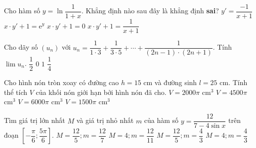 \begin{ex}%
Cho hàm số $y=\ln \dfrac{1}{1+x}$. Khẳng định nào sau đây là khẳng định \textbf{sai}?
\choice
	{$y'=\dfrac{-1}{x+1}$}
	{\True $x \cdot y'+1=\mathrm{e}^y$}
	{$x \cdot y'+1=0$}
	{$x \cdot y'+1=\dfrac{1}{x+1}$}
\end{ex}
\begin{ex}%
Cho dãy số $\left(u_n\right)$ với $u_n=\dfrac{1}{1 \cdot 3}+\dfrac{1}{3 \cdot 5}+\cdots +\dfrac{1}{(2n-1)\cdot(2n+1)}$. Tính $\displaystyle\lim u_n$.
	\choice
	{\True $\dfrac{1}{2}$}
	{$0$}
	{$1$}
	{$\dfrac{1}{4}$}
\end{ex}
\begin{ex}%
Cho hình nón tròn xoay có đường cao $h=15$ cm và đường sinh $l=25$ cm. Tính thể tích $V$ của khối nón giới hạn bởi hình nón đã cho.
\choice
	{\True $V=2000\pi$ cm$^3$}
	{$V=4500\pi$ cm$^3$}
	{$V=6000\pi$ cm$^3$}
	{$V=1500\pi$ cm$^3$}
\end{ex}
\begin{ex}%
Tìm giá trị lớn nhất $M$ và giá trị nhỏ nhất $m$ của hàm số $y=\dfrac{12}{7-4\sin x}$ trên đoạn $\left[-\dfrac{\pi}{6};\dfrac{5\pi}{6}\right]$.
\choice
	{$M=\dfrac{12}{5};m=\dfrac{12}{7}$}
	{$M=4;m=\dfrac{12}{11}$}
	{$M=\dfrac{12}{5};m=\dfrac{4}{3}$}
	{\True $M=4;m=\dfrac{4}{3}$}
\end{ex}
